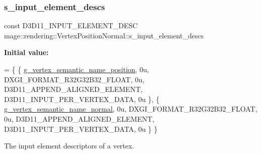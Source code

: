 \subsubsection{\texorpdfstring{s\+\_\+input\+\_\+element\+\_\+descs}{s\_input\_element\_descs}}
{\footnotesize\ttfamily const D3\+D11\+\_\+\+I\+N\+P\+U\+T\+\_\+\+E\+L\+E\+M\+E\+N\+T\+\_\+\+D\+E\+SC mage\+::rendering\+::\+Vertex\+Position\+Normal\+::s\+\_\+input\+\_\+element\+\_\+descs\hspace{0.3cm}{\ttfamily [static]}}

{\bfseries Initial value\+:}
\begin{DoxyCode}
= \{
        \{ \mbox{\hyperlink{namespacemage_1_1rendering_1_1anonymous__namespace_02vertex_8cpp_03_a6e875b92e4de38b14e8dc404df41a5ad}{g\_vertex\_semantic\_name\_position}}, 0u, DXGI\_FORMAT\_R32G32B32\_FLOAT, 
         0u, D3D11\_APPEND\_ALIGNED\_ELEMENT, D3D11\_INPUT\_PER\_VERTEX\_DATA, 0u \},
        \{ \mbox{\hyperlink{namespacemage_1_1rendering_1_1anonymous__namespace_02vertex_8cpp_03_a1b4bf08af207f8c1681ecf617b094ef3}{g\_vertex\_semantic\_name\_normal}},   0u, DXGI\_FORMAT\_R32G32B32\_FLOAT,   
       0u, D3D11\_APPEND\_ALIGNED\_ELEMENT, D3D11\_INPUT\_PER\_VERTEX\_DATA, 0u \}
    \}
\end{DoxyCode}
The input element descriptors of a vertex. 